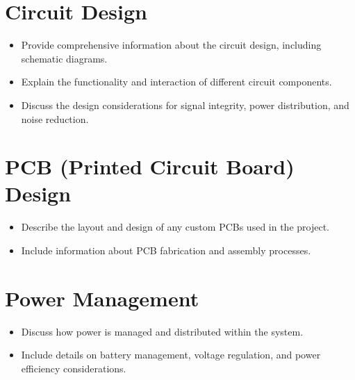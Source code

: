 \section{Circuit Design}
\begin{itemize}
	\item Provide comprehensive information about the circuit design, including schematic diagrams.
	\item Explain the functionality and interaction of different circuit components.
	\item Discuss the design considerations for signal integrity, power distribution, and noise reduction.
\end{itemize}
\section{PCB (Printed Circuit Board) Design}
\begin{itemize}
	\item Describe the layout and design of any custom PCBs used in the project.
	\item Include information about PCB fabrication and assembly processes.
\end{itemize}
\section{Power Management}
\begin{itemize}
	\item Discuss how power is managed and distributed within the system.
	\item Include details on battery management, voltage regulation, and power efficiency considerations.
\end{itemize}